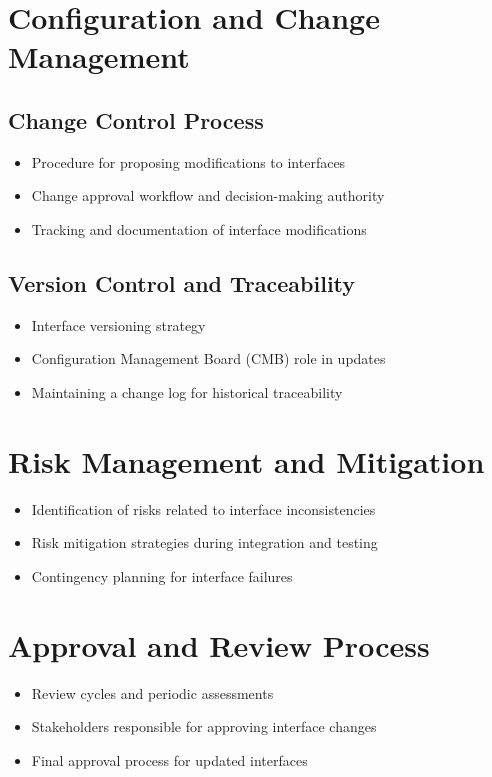 \documentclass{article}
\begin{document}
\section{Configuration and Change Management}

\subsection{Change Control Process}
\begin{itemize}
    \item Procedure for proposing modifications to interfaces
    \item Change approval workflow and decision-making authority
    \item Tracking and documentation of interface modifications
\end{itemize}

\subsection{Version Control and Traceability}
\begin{itemize}
    \item Interface versioning strategy
    \item Configuration Management Board (CMB) role in updates
    \item Maintaining a change log for historical traceability
\end{itemize}

\section{Risk Management and Mitigation}

\begin{itemize}
    \item Identification of risks related to interface inconsistencies
    \item Risk mitigation strategies during integration and testing
    \item Contingency planning for interface failures
\end{itemize}

\section{Approval and Review Process}

\begin{itemize}
    \item Review cycles and periodic assessments
    \item Stakeholders responsible for approving interface changes
    \item Final approval process for updated interfaces
\end{itemize}
\end{document}
